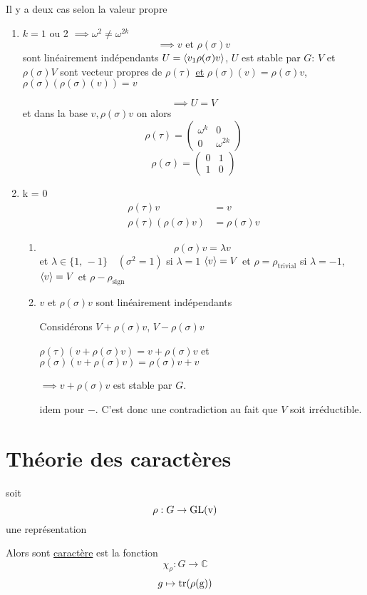 Il y a deux cas selon la valeur propre 

\begin{enumerate}
	\item $k=1$ ou 2 $\implies \omega^{2}\neq \omega^{2k}$
		\[ \implies v \text{ et } \rho(\sigma) v  \] sont linéairement indépendants $U = \expval{v_1 \rho (\sigma)v}$, $U$ est stable par $G$: $V$ et $\rho(\sigma)V$ sont vecteur propres de $\rho (\tau)$ \underline{et} $	\rho(\sigma)(v) = \rho(\sigma) v$, $\rho(\sigma)(\rho(\sigma)(v)) = v$ 

		\[ \implies U = V \] et dans la base $v, \rho(\sigma) v$ on alors
		\[ \rho(\tau) = \begin{pmatrix} \omega^{k}& 0 \\ 0& \omega^{2k} \end{pmatrix}  \]
		\[ \rho(\sigma) = \begin{pmatrix} 0 & 1\\ 1 &0 \end{pmatrix}  \]

\item k = 0 
	\begin{align*}
		\rho(\tau) v &= v\\  \rho(\tau)(\rho (\sigma) v) &= \rho(\sigma)v	
	\end{align*}
	\begin{enumerate}
		\item \[ \rho(\sigma) v = \lambda v \] et $ \lambda \in \{ 1,\, -1 \}  \quad (\sigma^{2}=1)$
			si $\lambda =1$ $\expval{v} = V$ et $\rho = \rho_{\text{trivial}} $
			si $\lambda =-1$, $\expval{v} = V$ et $ \rho - \rho_{\text{sign}} $
		\item $v$ et $\rho(\sigma) v$ sont linéairement indépendants

			Considérons $V + \rho(\sigma)v$, $V - \rho(\sigma)v$

			$\rho(\tau)(v + \rho(\sigma)v) = v + \rho(\sigma)v$
			et $\rho(\sigma) (v+\rho(\sigma) v) = \rho(\sigma) v + v$

			$\implies v + \rho(\sigma) v$ est stable par $G$.

			idem pour $-$. C'est donc une contradiction au fait que $V$ soit irréductible.
	\end{enumerate}
\end{enumerate}


\section*{Théorie des caractères}

soit \[ \rho: G \to \rm{GL}(v) \] une représentation

Alors sont \underline{caractère} est la fonction \[ \chi_
\rho : G \to \mathds{C}\]
\[ g\mapsto \rm{tr}(\rho(g))\]


